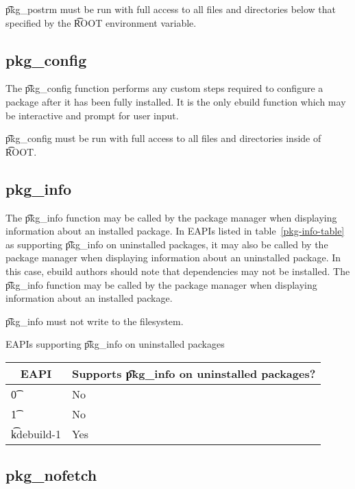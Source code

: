 \t{pkg\_postrm} must be run with full access to all files and directories below that specified by
the \t{ROOT} environment variable.

\subsection{pkg\_config}
\label{pkg-config-function}

The \t{pkg\_config} function performs any custom steps required to configure a package after it has been
fully installed. It is the only ebuild function which may be interactive and prompt for user input.

\t{pkg\_config} must be run with full access to all files and directories inside of \t{ROOT}.

\subsection{pkg\_info}
\label{pkg-info-function}

\IFKDEBUILDELSE
{
    The \t{pkg\_info} function may be called by the package manager when displaying information about an
    installed package. In EAPIs listed in table~\ref{pkg-info-table} as supporting \t{pkg\_info} on
    uninstalled packages, it may also be called by the package manager when displaying information
    about an uninstalled package. In this case, ebuild authors should note that dependencies may not be
    installed.
}{
    The \t{pkg\_info} function may be called by the package manager when displaying information about an
    installed package.
}

\t{pkg\_info} must not write to the filesystem.

\IFKDEBUILDELSE
{
    \begin{centertable}{EAPIs supporting \t{pkg\_info} on uninstalled packages} \label{pkg-info-table}
    \begin{tabular}{ l l }
        \toprule
        \multicolumn{1}{c}{\textbf{EAPI}} &
        \multicolumn{1}{c}{\textbf{Supports \t{pkg\_info} on uninstalled packages?}} \\
        \midrule
    \t{0} & No \\
    \t{1} & No \\
    \t{kdebuild-1} & Yes \\
    \bottomrule
    \end{tabular}
    \end{centertable}
}{
}

\subsection{pkg\_nofetch}
\label{pkg-nofetch-function}

